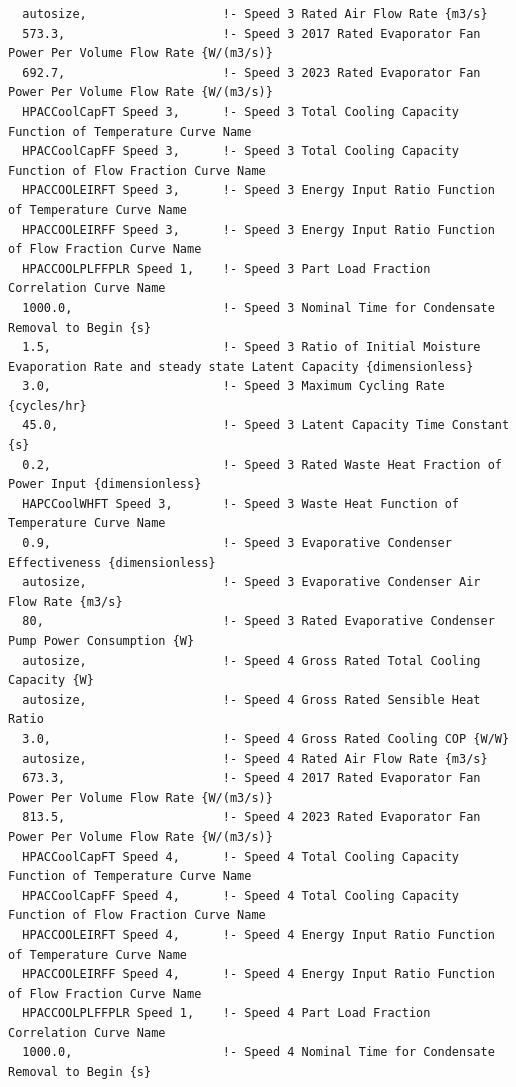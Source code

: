 \begin{lstlisting}
  autosize,                   !- Speed 3 Rated Air Flow Rate {m3/s}
  573.3,                      !- Speed 3 2017 Rated Evaporator Fan Power Per Volume Flow Rate {W/(m3/s)}
  692.7,                      !- Speed 3 2023 Rated Evaporator Fan Power Per Volume Flow Rate {W/(m3/s)}
  HPACCoolCapFT Speed 3,      !- Speed 3 Total Cooling Capacity Function of Temperature Curve Name
  HPACCoolCapFF Speed 3,      !- Speed 3 Total Cooling Capacity Function of Flow Fraction Curve Name
  HPACCOOLEIRFT Speed 3,      !- Speed 3 Energy Input Ratio Function of Temperature Curve Name
  HPACCOOLEIRFF Speed 3,      !- Speed 3 Energy Input Ratio Function of Flow Fraction Curve Name
  HPACCOOLPLFFPLR Speed 1,    !- Speed 3 Part Load Fraction Correlation Curve Name
  1000.0,                     !- Speed 3 Nominal Time for Condensate Removal to Begin {s}
  1.5,                        !- Speed 3 Ratio of Initial Moisture Evaporation Rate and steady state Latent Capacity {dimensionless}
  3.0,                        !- Speed 3 Maximum Cycling Rate {cycles/hr}
  45.0,                       !- Speed 3 Latent Capacity Time Constant {s}
  0.2,                        !- Speed 3 Rated Waste Heat Fraction of Power Input {dimensionless}
  HAPCCoolWHFT Speed 3,       !- Speed 3 Waste Heat Function of Temperature Curve Name
  0.9,                        !- Speed 3 Evaporative Condenser Effectiveness {dimensionless}
  autosize,                   !- Speed 3 Evaporative Condenser Air Flow Rate {m3/s}
  80,                         !- Speed 3 Rated Evaporative Condenser Pump Power Consumption {W}
  autosize,                   !- Speed 4 Gross Rated Total Cooling Capacity {W}
  autosize,                   !- Speed 4 Gross Rated Sensible Heat Ratio
  3.0,                        !- Speed 4 Gross Rated Cooling COP {W/W}
  autosize,                   !- Speed 4 Rated Air Flow Rate {m3/s}
  673.3,                      !- Speed 4 2017 Rated Evaporator Fan Power Per Volume Flow Rate {W/(m3/s)}
  813.5,                      !- Speed 4 2023 Rated Evaporator Fan Power Per Volume Flow Rate {W/(m3/s)}
  HPACCoolCapFT Speed 4,      !- Speed 4 Total Cooling Capacity Function of Temperature Curve Name
  HPACCoolCapFF Speed 4,      !- Speed 4 Total Cooling Capacity Function of Flow Fraction Curve Name
  HPACCOOLEIRFT Speed 4,      !- Speed 4 Energy Input Ratio Function of Temperature Curve Name
  HPACCOOLEIRFF Speed 4,      !- Speed 4 Energy Input Ratio Function of Flow Fraction Curve Name
  HPACCOOLPLFFPLR Speed 1,    !- Speed 4 Part Load Fraction Correlation Curve Name
  1000.0,                     !- Speed 4 Nominal Time for Condensate Removal to Begin {s}

\end{lstlisting}
